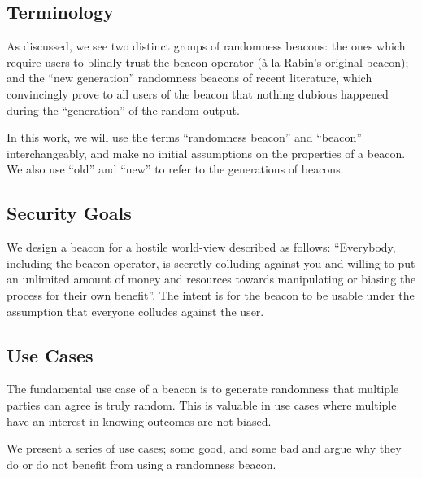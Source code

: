 \subsection{Terminology}
As discussed, we see two distinct groups of randomness beacons: the ones which require users to blindly trust the beacon operator (à la Rabin's original beacon); and the \enquote{new generation} randomness beacons of recent literature, which convincingly prove to all users of the beacon that nothing dubious happened during the \enquote{generation} of the random output.

In this work, we will use the terms \enquote{randomness beacon} and \enquote{beacon} interchangeably, and make no initial assumptions on the properties of a beacon. We also use \enquote{old} and \enquote{new} to refer to the generations of beacons.

\subsection{Security Goals}\label{sec:security_goals}
We design a beacon for a hostile world-view described as follows:
\enquote{Everybody, including the beacon operator, is secretly colluding against you and willing to put an unlimited amount of money and resources towards manipulating or biasing the process for their own benefit}.
The intent is for the beacon to be usable under the assumption that everyone colludes against the user.

\subsection{Use Cases}
The fundamental use case of a beacon is to generate randomness that multiple parties can agree is truly random. This is valuable in use cases where multiple have an interest in knowing outcomes are not biased.

We present a series of use cases; some good, and some bad and argue why they do or do not benefit from using a randomness beacon.

